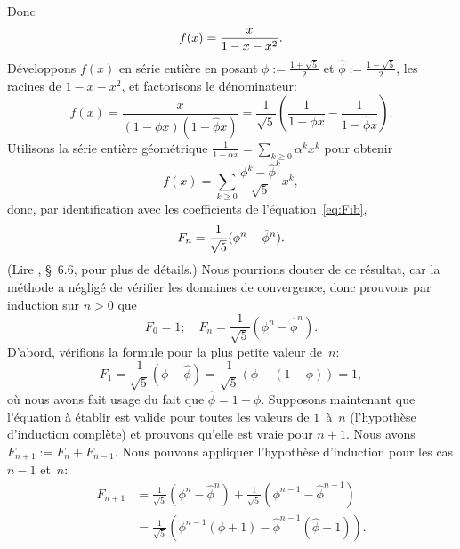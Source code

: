 Donc
\begin{equation*}
\abovedisplayskip=0pt
\abovedisplayshortskip=0pt
\belowdisplayskip=4pt
f(x) = \frac{x}{1 - x - x^2}.
\end{equation*}
Développons \(f(x)\) en série entière en posant \(\phi :=
\frac{1+\sqrt{5}}{2}\) et \(\hat\phi := \frac{1-\sqrt{5}}{2}\), les
racines de \(1 - x - x^2\), et factorisons le dénominateur:
\begin{equation*}
f(x) = \frac{x}{(1-\phi x)(1-\hat\phi x)}
     = \frac{1}{\sqrt{5}}\left(\frac{1}{1 - \phi x}
                              - \frac{1}{1 - \hat\phi x}\right).
\end{equation*}
Utilisons la série entière géométrique \(\frac{1}{1-\alpha x} =
\sum_{k \geqslant 0}{\alpha^kx^k}\) pour obtenir
\begin{equation*}
f(x) = \sum_{k \geqslant 0}{\frac{\phi^k-\hat\phi^k}{\sqrt{5}}}x^k,
\end{equation*}
donc, par identification avec les coefficients de
l'équation~\eqref{eq:Fib},
\begin{equation*}
\abovedisplayskip=4pt
\abovedisplayshortskip=4pt
\belowdisplayskip=4pt
F_n = \frac{1}{\sqrt{5}}(\phi^n - \hat\phi^n).
\end{equation*}
(Lire \cite{GrahamKnuthPatashnik_1994}, \S~6.6, pour plus de détails.)
Nous pourrions douter de ce résultat, car la méthode a négligé de
vérifier les domaines de convergence, donc
prouvons par induction sur \(n > 0\) que
\begin{equation*}
F_0 = 1;\quad F_n = \frac{1}{\sqrt{5}}(\phi^n - \hat\phi^n).
\end{equation*}
D'abord, vérifions la formule pour la plus petite valeur de~\(n\):
\begin{equation*}
F_1 = \frac{1}{\sqrt{5}}(\phi - \hat\phi)
   = \frac{1}{\sqrt{5}}(\phi - (1 - \phi)) = 1,
\end{equation*}
où nous avons fait usage du fait que \(\hat\phi = 1 -
\phi\). Supposons maintenant que l'équation à établir est valide pour
toutes les valeurs de \(1\)~à~\(n\) (l'hypothèse d'induction complète)
et prouvons qu'elle est vraie pour \(n+1\). Nous avons \( F_{n+1} :=
F_n + F_{n-1}\). Nous pouvons appliquer l'hypothèse d'induction pour
les cas \(n-1\) et~\(n\):
\begin{align*}
F_{n+1} &= \frac{1}{\sqrt{5}}(\phi^n - \hat\phi^n) +
          \frac{1}{\sqrt{5}}(\phi^{n-1} - \hat\phi^{n-1})\\
       &= \frac{1}{\sqrt{5}}(\phi^{n-1}(\phi + 1) -
          \hat\phi^{n-1}(\hat\phi + 1)).
\end{align*}
